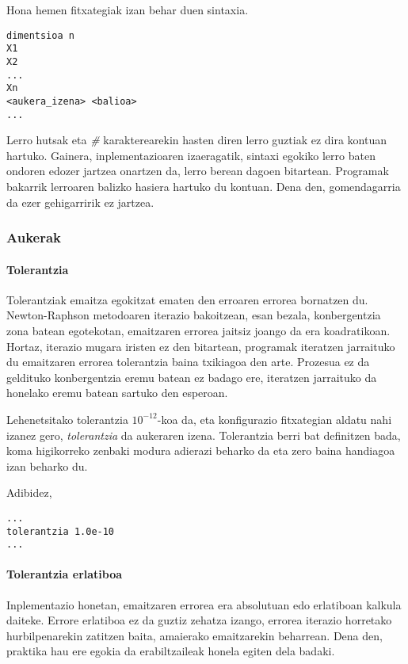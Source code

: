 \documentclass[10pt,a4paper,basque]{article}
\begin{document}
Hona hemen fitxategiak izan behar duen sintaxia.

\begin{lstlisting}
dimentsioa n
X1
X2
...
Xn
<aukera_izena> <balioa>
...
\end{lstlisting}

Lerro hutsak eta \emph{\#} karakterearekin hasten diren lerro guztiak ez dira kontuan hartuko. Gainera, inplementazioaren izaeragatik, sintaxi egokiko lerro baten ondoren edozer jartzea onartzen da, lerro berean dagoen bitartean. Programak bakarrik lerroaren balizko hasiera hartuko du kontuan. Dena den, gomendagarria da ezer gehigarririk ez jartzea.

\subsubsection{Aukerak}

\paragraph{Tolerantzia}

Tolerantziak emaitza egokitzat ematen den erroaren errorea bornatzen du. Newton-Raphson metodoaren iterazio bakoitzean, esan bezala, konbergentzia zona batean egotekotan, emaitzaren errorea jaitsiz joango da era koadratikoan. Hortaz, iterazio mugara iristen ez den bitartean, programak iteratzen jarraituko du emaitzaren errorea tolerantzia baina txikiagoa den arte. Prozesua ez da geldituko konbergentzia eremu batean ez badago ere, iteratzen jarraituko da honelako eremu batean sartuko den esperoan.

Lehenetsitako tolerantzia $10^{-12}$-koa da, eta konfigurazio fitxategian aldatu nahi izanez gero, \emph{tolerantzia} da aukeraren izena. Tolerantzia berri bat definitzen bada, koma higikorreko zenbaki modura adierazi beharko da eta zero baina handiagoa izan beharko du.

Adibidez,

\begin{lstlisting}
...
tolerantzia 1.0e-10
...
\end{lstlisting}

\paragraph{Tolerantzia erlatiboa}

Inplementazio honetan, emaitzaren errorea era absolutuan edo erlatiboan kalkula daiteke. Errore erlatiboa ez da guztiz zehatza izango, errorea iterazio horretako hurbilpenarekin zatitzen baita, amaierako emaitzarekin beharrean. Dena den, praktika hau ere egokia da erabiltzaileak honela egiten dela badaki.
\end{document}
